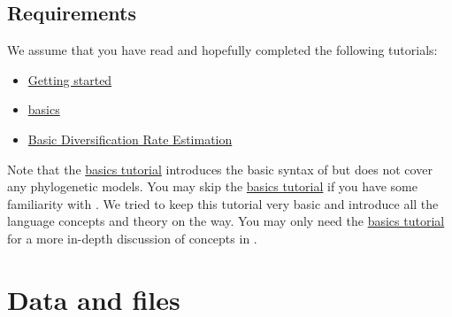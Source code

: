 \subsection*{Requirements}

We assume that you have read and hopefully completed the following tutorials:
\begin{itemize}
\item \href{https://github.com/revbayes/revbayes_tutorial/raw/master/tutorial_TeX/RB_Getting_Started/RB_Getting_Started.pdf}{Getting started}
\item \href{https://github.com/revbayes/revbayes_tutorial/raw/master/tutorial_TeX/RB_Basics_Tutorial/RB_Basics_Tutorial.pdf}{\Rev basics}
\item \href{https://github.com/revbayes/revbayes_tutorial/raw/master/tutorial_TeX/RB_DiversificationRate_Tutorial/RB_DiversificationRate_Tutorial.pdf}{Basic Diversification Rate Estimation}
\end{itemize}
Note that the \href{https://github.com/revbayes/revbayes_tutorial/raw/master/tutorial_TeX/RB_Basics_Tutorial/RB_Basics_Tutorial.pdf}{\Rev basics tutorial} introduces the basic syntax of \Rev but does not cover any phylogenetic models.
You may skip the \href{https://github.com/revbayes/revbayes_tutorial/raw/master/tutorial_TeX/RB_Basics_Tutorial/RB_Basics_Tutorial.pdf}{\Rev basics tutorial} if you have some familiarity with \R.
We tried to keep this tutorial very basic and introduce all the language concepts and theory on the way.
You may only need the \href{https://github.com/revbayes/revbayes_tutorial/raw/master/tutorial_TeX/RB_Basics_Tutorial/RB_Basics_Tutorial.pdf}{\Rev basics tutorial} for a more in-depth discussion of concepts in \Rev.

\section*{Data and files} \label{sec:data_files}


